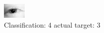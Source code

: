 \begin{figure}[h!]
\begin{center}
\includegraphics[width=0.60\columnwidth]{figures/ID92_class_4_target_3.png}
\end{center}
\caption{ Classification: 4 actual target: 3}
\label{fig:ID92_class_4_target_3}
\end{figure}
